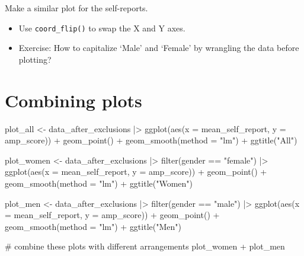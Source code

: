 \documentclass[
  letterpaper,
  DIV=11,
  numbers=noendperiod]{scrreprt}
\newenvironment{Shaded}{\begin{snugshade}}{\end{snugshade}}
\newcommand{\AttributeTok}[1]{\textcolor[rgb]{0.40,0.45,0.13}{#1}}
\newcommand{\CommentTok}[1]{\textcolor[rgb]{0.37,0.37,0.37}{#1}}
\newcommand{\FunctionTok}[1]{\textcolor[rgb]{0.28,0.35,0.67}{#1}}
\newcommand{\NormalTok}[1]{\textcolor[rgb]{0.00,0.23,0.31}{#1}}
\newcommand{\OtherTok}[1]{\textcolor[rgb]{0.00,0.23,0.31}{#1}}
\newcommand{\SpecialCharTok}[1]{\textcolor[rgb]{0.37,0.37,0.37}{#1}}
\newcommand{\StringTok}[1]{\textcolor[rgb]{0.13,0.47,0.30}{#1}}
\providecommand{\tightlist}{%
  \setlength{\itemsep}{0pt}\setlength{\parskip}{0pt}}\usepackage{longtable,booktabs,array}
\begin{document}
Make a similar plot for the self-reports.

\begin{itemize}
\tightlist
\item
  Use \texttt{coord\_flip()} to swap the X and Y axes.
\end{itemize}

\begin{itemize}
\tightlist
\item
  Exercise: How to capitalize `Male' and `Female' by wrangling the data
  before plotting?
\end{itemize}


\chapter{Combining plots}\label{combining-plots}

\begin{Shaded}
\begin{Highlighting}[]
\NormalTok{plot\_all }\OtherTok{\textless{}{-}}\NormalTok{ data\_after\_exclusions }\SpecialCharTok{|\textgreater{}}
  \FunctionTok{ggplot}\NormalTok{(}\FunctionTok{aes}\NormalTok{(}\AttributeTok{x =}\NormalTok{ mean\_self\_report,}
             \AttributeTok{y =}\NormalTok{ amp\_score)) }\SpecialCharTok{+}
  \FunctionTok{geom\_point}\NormalTok{() }\SpecialCharTok{+}
  \FunctionTok{geom\_smooth}\NormalTok{(}\AttributeTok{method =} \StringTok{"lm"}\NormalTok{) }\SpecialCharTok{+}
  \FunctionTok{ggtitle}\NormalTok{(}\StringTok{"All"}\NormalTok{)}

\NormalTok{plot\_women }\OtherTok{\textless{}{-}}\NormalTok{ data\_after\_exclusions }\SpecialCharTok{|\textgreater{}}
  \FunctionTok{filter}\NormalTok{(gender }\SpecialCharTok{==} \StringTok{"female"}\NormalTok{) }\SpecialCharTok{|\textgreater{}}
  \FunctionTok{ggplot}\NormalTok{(}\FunctionTok{aes}\NormalTok{(}\AttributeTok{x =}\NormalTok{ mean\_self\_report,}
             \AttributeTok{y =}\NormalTok{ amp\_score)) }\SpecialCharTok{+}
  \FunctionTok{geom\_point}\NormalTok{() }\SpecialCharTok{+}
  \FunctionTok{geom\_smooth}\NormalTok{(}\AttributeTok{method =} \StringTok{"lm"}\NormalTok{) }\SpecialCharTok{+}
  \FunctionTok{ggtitle}\NormalTok{(}\StringTok{"Women"}\NormalTok{)}

\NormalTok{plot\_men }\OtherTok{\textless{}{-}}\NormalTok{ data\_after\_exclusions }\SpecialCharTok{|\textgreater{}}
  \FunctionTok{filter}\NormalTok{(gender }\SpecialCharTok{==} \StringTok{"male"}\NormalTok{) }\SpecialCharTok{|\textgreater{}}
  \FunctionTok{ggplot}\NormalTok{(}\FunctionTok{aes}\NormalTok{(}\AttributeTok{x =}\NormalTok{ mean\_self\_report,}
             \AttributeTok{y =}\NormalTok{ amp\_score)) }\SpecialCharTok{+}
  \FunctionTok{geom\_point}\NormalTok{() }\SpecialCharTok{+}
  \FunctionTok{geom\_smooth}\NormalTok{(}\AttributeTok{method =} \StringTok{"lm"}\NormalTok{) }\SpecialCharTok{+}
  \FunctionTok{ggtitle}\NormalTok{(}\StringTok{"Men"}\NormalTok{)}

\CommentTok{\# combine these plots with different arrangements}
\NormalTok{plot\_women }\SpecialCharTok{+}\NormalTok{ plot\_men}
\end{Highlighting}
\end{Shaded}
\end{document}
